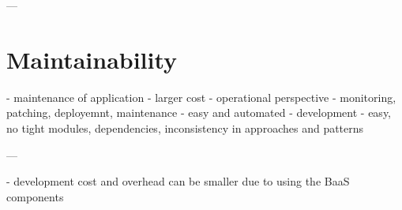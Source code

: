 ---

\section{Maintainability}

- maintenance of application - larger cost
- operational perspective - monitoring, patching, deployemnt, maintenance - easy and automated
- development - easy, no tight modules, dependencies, inconsistency in approaches and patterns

---


- development cost and overhead can be smaller due to using the BaaS components




